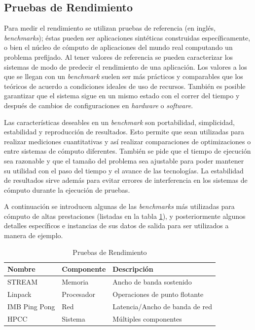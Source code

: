 \documentclass[a4paper]{report}
\begin{document}
\subsection{Pruebas de Rendimiento}

Para medir el rendimiento se utilizan pruebas de referencia (en inglés, {\em benchmarks}); éstas pueden ser aplicaciones sintéticas construidas específicamente, o bien el núcleo de cómputo de aplicaciones del mundo real computando un problema prefijado. Al tener valores de referencia se pueden caracterizar los sistemas de modo de predecir el rendimiento de una aplicación.
Los valores a los que se llegan con un {\it benchmark} suelen ser más prácticos y comparables que los teóricos de acuerdo a condiciones ideales de uso de recursos.
También es posible garantizar que el sistema sigue en un mismo estado con el correr del tiempo y después de cambios de configuraciones en {\it hardware} o {\it software}.

\bigskip

Las características deseables en un {\it benchmark} son portabilidad, simplicidad, estabilidad y reproducción de resultados. Esto permite que sean utilizadas para realizar mediciones cuantitativas y así realizar comparaciones de optimizaciones o entre sistemas de cómputo diferentes. También se pide que el tiempo de ejecución sea razonable y que el tamaño del problema sea ajustable para poder mantener su utilidad con el paso del tiempo y el avance de las tecnologías. La estabilidad de resultados sirve además para evitar errores de interferencia en los sistemas de cómputo durante la ejecución de pruebas.

\bigskip

A continuación se introducen algunas de las {\it benchmarks} más utilizadas para cómputo de altas prestaciones (listadas en la tabla \ref{table:benchmark-list}),
y posteriormente algunos detalles específicos e instancias de sus datos de salida para ser utilizados a manera de ejemplo.

\begin{table}[H]
    \caption{Pruebas de Rendimiento}
    \centering
    \begin{tabular}{|l|l|l|}\hline
      {\bf Nombre} & {\bf Componente} & {\bf Descripción} \\ \hline
      STREAM & Memoria & Ancho de banda sostenido \\ \hline
      Linpack & Procesador & Operaciones de punto flotante \\ \hline
      IMB Ping Pong & Red & Latencia/Ancho de banda de red \\ \hline
      HPCC & Sistema & Múltiples componentes \\ \hline
        \end{tabular}
  \label{table:benchmark-list}
\end{table}
\end{document}
